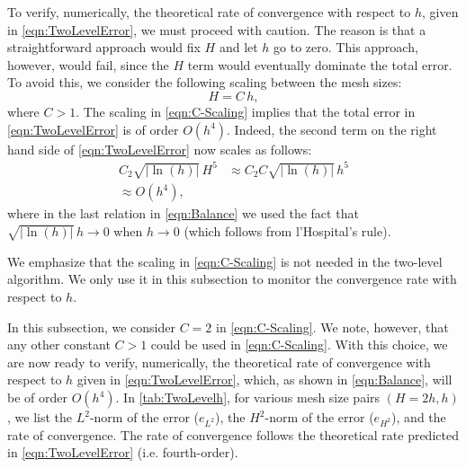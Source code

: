 To verify, numerically, the theoretical rate of convergence with respect to
$h$, given in \eqref{eqn:TwoLevelError}, we must proceed with caution. The reason is
that a straightforward approach would fix $H$ and let $h$ go to zero. This
approach, however, would fail, since the $H$ term would eventually dominate the
total error. To avoid this, we consider the following scaling between the mesh
sizes:
\begin{equation}
  H = C\, h,
  \label{eqn:C-Scaling}
\end{equation}
where $C>1$. The scaling in \eqref{eqn:C-Scaling} implies that the total error
in \eqref{eqn:TwoLevelError} is of order $O(h^4)$. Indeed, the second term on the
right hand side of \eqref{eqn:TwoLevelError} now scales as follows:
\begin{equation}
  \begin{split}
    C_2 \sqrt{|\ln(h)|}\, H^5 &\approx C_2 C \sqrt{|\ln(h)|}\, h^5 \\
    \approx O(h^4),
  \end{split}
  \label{eqn:Balance}
\end{equation}
where in the last relation in \eqref{eqn:Balance} we used the fact that
$\sqrt{|\ln(h)|}\, h \rightarrow 0$ when $h \rightarrow 0$ (which follows from
l'Hospital's rule).

\begin{remark}
  We emphasize that the scaling in \eqref{eqn:C-Scaling} is not needed in the
  two-level algorithm. We only use it in this subsection to monitor the
  convergence rate with respect to $h$.
\end{remark}

In this subsection, we consider $C=2$ in \eqref{eqn:C-Scaling}. We note,
however, that any other constant $C>1$ could be used in \eqref{eqn:C-Scaling}.
With this choice, we are now ready to verify, numerically, the theoretical rate
of convergence with respect to $h$ given in \eqref{eqn:TwoLevelError}, which, as
shown in \eqref{eqn:Balance}, will be of order $O(h^4)$. In
\autoref{tab:TwoLevelh}, for various mesh size pairs $(H=2h, h)$, we list the
$L^2$-norm of the error ($e_{L^2}$), the $H^2$-norm of the error ($e_{H^2}$),
and the rate of convergence. The rate of convergence follows the theoretical
rate predicted in \eqref{eqn:TwoLevelError} (i.e. fourth-order).

